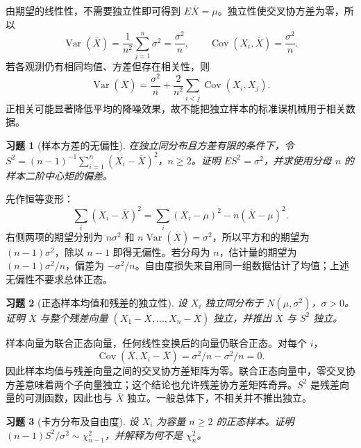 \documentclass[12pt,fontset=fandol]{ctexart}
\newtheorem{exercise}{习题}[section]
\begin{document}
\begin{solve}\label{a:B8.1}由期望的线性性，不需要独立性即可得到 $E\overline X=\mu$。独立性使交叉协方差为零，所以\[\operatorname{Var}(\overline X)=\frac{1}{n^2}\sum_{j=1}^n\sigma^2=\frac{\sigma^2}{n},\qquad\operatorname{Cov}(X_i,\overline X)=\frac{\sigma^2}{n}.\]若各观测仍有相同均值、方差但存在相关性，则\[\operatorname{Var}(\overline X)=\frac{\sigma^2}{n}+\frac{2}{n^2}\sum_{i<j}\operatorname{Cov}(X_i,X_j).\]正相关可能显著降低平均的降噪效果，故不能把独立样本的标准误机械用于相关数据。\end{solve}

\begin{exercise}[样本方差的无偏性]\label{q:B8.2}
在独立同分布且方差有限的条件下，令 $S^2=(n-1)^{-1}\sum_{i=1}^n(X_i-\overline X)^2$，$n\ge2$。证明 $ES^2=\sigma^2$，并求使用分母 $n$ 的样本二阶中心矩的偏差。\par{}
\end{exercise}

\begin{solve}\label{a:B8.2}先作恒等变形：\[\sum_i(X_i-\overline X)^2=\sum_i(X_i-\mu)^2-n(\overline X-\mu)^2.\]右侧两项的期望分别为 $n\sigma^2$ 和 $n\operatorname{Var}(\overline X)=\sigma^2$，所以平方和的期望为 $(n-1)\sigma^2$，除以 $n-1$ 即得无偏性。若分母为 $n$，估计量的期望为 $(n-1)\sigma^2/n$，偏差为 $-\sigma^2/n$。自由度损失来自用同一组数据估计了均值；上述无偏性不要求总体正态。\end{solve}

\begin{exercise}[正态样本均值和残差的独立性]\label{q:B8.3}
设 $X_i$ 独立同分布于 $N(\mu,\sigma^2)$，$\sigma>0$。证明 $\overline X$ 与整个残差向量 $(X_1-\overline X,\ldots,X_n-\overline X)$ 独立，并推出 $\overline X$ 与 $S^2$ 独立。\par{}
\end{exercise}

\begin{solve}\label{a:B8.3}样本向量为联合正态向量，任何线性变换后的向量仍联合正态。对每个 $i$，\[\operatorname{Cov}(\overline X,X_i-\overline X)=\sigma^2/n-\sigma^2/n=0.\]因此样本均值与残差向量之间的交叉协方差矩阵为零。联合正态向量中，零交叉协方差意味着两个子向量独立；这个结论也允许残差协方差矩阵奇异。$S^2$ 是残差向量的可测函数，因此也与 $\overline X$ 独立。一般总体下，不相关并不推出独立。\end{solve}

\begin{exercise}[卡方分布及自由度]\label{q:B8.4}
设 $X_i$ 为容量 $n\ge2$ 的正态样本。证明 $(n-1)S^2/\sigma^2\sim\chi^2_{n-1}$，并解释为何不是 $\chi^2_n$。\par{}
\end{exercise}
\end{document}
